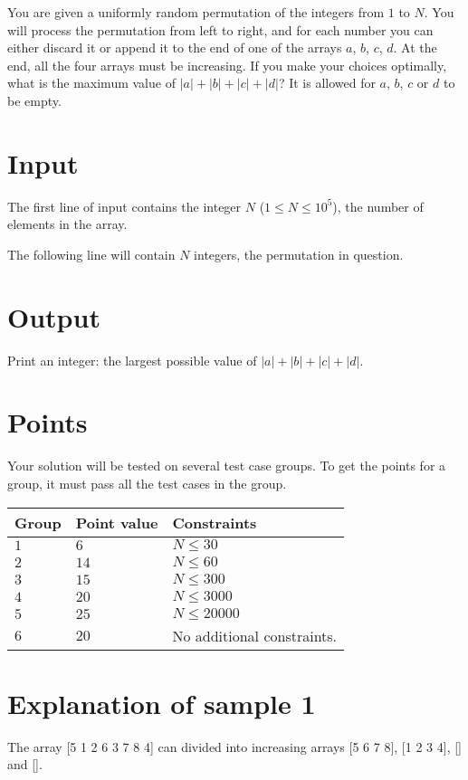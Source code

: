 \noindent

You are given a uniformly random permutation of the integers from $1$ to $N$.
You will process the permutation from left to right, and for each number
you can either discard it or append it to the end of one of
the arrays $a$, $b$, $c$, $d$. At the end, all the four arrays must
be increasing. If you make your choices optimally, what is the maximum
value of $|a|+|b|+|c|+|d|$? It is allowed for $a$, $b$, $c$ or $d$ to
be empty.

\section*{Input}
The first line of input contains the integer $N$ ($1 \leq N \leq 10^5$),
the number of elements in the array.

The following line will contain $N$ integers, the permutation in question.


\section*{Output}
Print an integer: the largest possible value of $|a|+|b|+|c|+|d|$.


\section*{Points}
Your solution will be tested on several test case groups. To get the points for
a group, it must pass all the test cases in the group.

\noindent
\begin{tabular}{| l | l | p{12cm} |}
  \hline
  \textbf{Group} & \textbf{Point value} & \textbf{Constraints} \\ \hline
  $1$    & $6$        & $N \leq 30$ \\ \hline
  $2$    & $14$       & $N \leq 60$ \\ \hline
  $3$    & $15$       & $N \leq 300$ \\ \hline
  $4$    & $20$       & $N \leq 3000$ \\ \hline
  $5$    & $25$       & $N \leq 20000$ \\ \hline
  $6$    & $20$       & No additional constraints. \\ \hline
\end{tabular}

\section*{Explanation of sample 1}
The array [5 1 2 6 3 7 8 4] can divided into increasing arrays [5 6 7 8], [1 2 3 4], [] and [].

